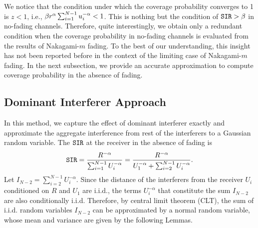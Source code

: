 \documentclass[journal,draftclsnofoot,onecolumn,12pt]{IEEEtran}
\begin{document}
We notice that the condition under which the coverage probability converges to 1 is $z<1$, i.e., $\beta r^{\alpha} \sum_{i=1}^{N-1}u_i^{-\alpha} < 1$. This is nothing but the condition of $\mathtt{SIR}>\beta$ in no-fading channels. Therefore, quite interestingly, we obtain only a redundant condition when the coverage probability in no-fading channels is evaluated from the results of Nakagami-$m$ fading. To the best of our understanding, this insight has not been reported before in the context of the limiting case of Nakagami-$m$ fading. In the next subsection, we provide an accurate approximation to compute  coverage probability in the absence of fading.

\subsection{Dominant Interferer Approach}
In this method, we capture the effect of dominant interferer exactly and approximate the aggregate interference from rest of the interferers to a Gaussian random variable.
The $\mathtt{SIR}$ at the receiver in the absence of fading is
\begin{equation}
\mathtt{SIR} = \frac{R^{-\alpha}}{\sum_{i=1}^{N-1} U_i^{-\alpha}} = \frac{R^{-\alpha}}{U_1^{-\alpha} + \sum_{i=2}^{N-1} U_i^{-\alpha}}.
\end{equation}
Let $I_{N-2} = \sum_{i=2}^{N-1} U_i^{-\alpha}$. Since the distance of the interferers from the receiver $U_i$ conditioned on $R$ and $U_1$ are i.i.d., the terms $U_i^{-\alpha}$ that constitute the sum $I_{N-2}$ are also conditionally i.i.d. Therefore, by central limit theorem (CLT), the sum of i.i.d. random variables $I_{N-2}$ can be approximated by a normal random variable, whose mean and variance are given by the following Lemmas.
\end{document}
